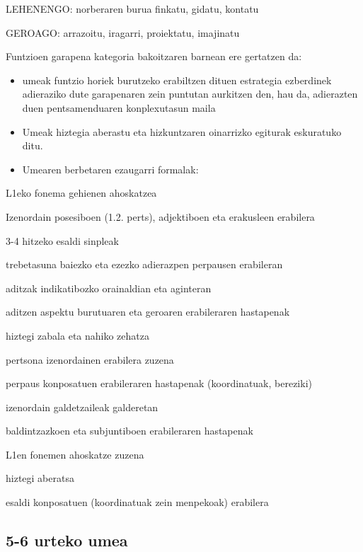 \documentclass[
]{book}
\providecommand{\tightlist}{%
  \setlength{\itemsep}{0pt}\setlength{\parskip}{0pt}}
\begin{document}
LEHENENGO: norberaren burua finkatu, gidatu, kontatu

GEROAGO: arrazoitu, iragarri, proiektatu, imajinatu

Funtzioen garapena kategoria bakoitzaren barnean ere gertatzen da:

\begin{itemize}
\item
  umeak funtzio horiek burutzeko erabiltzen dituen estrategia ezberdinek adieraziko dute garapenaren zein puntutan aurkitzen den, hau da, adierazten duen pentsamenduaren konplexutasun maila
\item
  Umeak hiztegia aberastu eta hizkuntzaren oinarrizko egiturak eskuratuko ditu.
\item
  Umearen berbetaren ezaugarri formalak:
\end{itemize}

\begin{description}
\tightlist
\item[3 urte]
L1eko fonema gehienen ahoskatzea

Izenordain posesiboen (1.2. perts), adjektiboen eta erakusleen erabilera

3-4 hitzeko esaldi sinpleak

trebetasuna baiezko eta ezezko adierazpen perpausen erabileran

aditzak indikatibozko orainaldian eta aginteran

aditzen aspektu burutuaren eta geroaren erabileraren hastapenak
\item[4 urte]
hiztegi zabala eta nahiko zehatza

pertsona izenordainen erabilera zuzena

perpaus konposatuen erabileraren hastapenak (koordinatuak, bereziki)

izenordain galdetzaileak galderetan

baldintzazkoen eta subjuntiboen erabileraren hastapenak
\item[5 urte]
L1en fonemen ahoskatze zuzena

hiztegi aberatsa

esaldi konposatuen (koordinatuak zein menpekoak) erabilera
\end{description}

\hypertarget{urteko-umea-2}{%
\subsection{5-6 urteko umea}\label{urteko-umea-2}}
\end{document}
